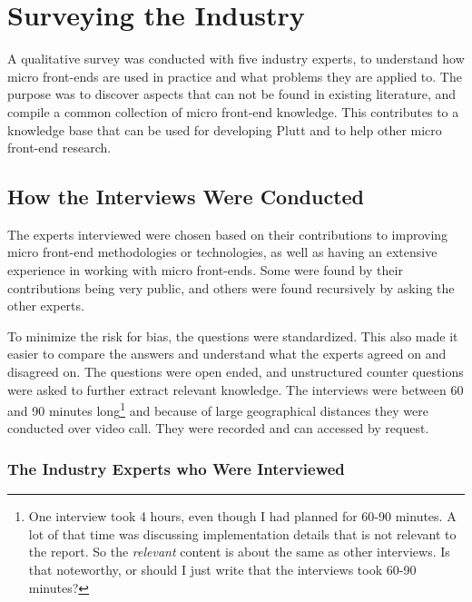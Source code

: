 \chapter{Surveying the Industry}
\label{sec:interviews}

A qualitative survey was conducted with five industry experts, to understand how micro front-ends are used in practice and what problems they are applied to. The purpose was to discover aspects that can not be found in existing literature, and compile a common collection of micro front-end knowledge. This contributes to a knowledge base that can be used for developing Plutt and to help other micro front-end research.

\section{How the Interviews Were Conducted}

The experts interviewed were chosen based on their contributions to improving micro front-end methodologies or technologies, as well as having an extensive experience in working with micro front-ends. Some were found by their contributions being very public, and others were found recursively by asking the other experts.

To minimize the risk for bias, the questions were standardized. This also made it easier to compare the answers and understand what the experts agreed on and disagreed on. The questions were open ended, and unstructured counter questions were asked to further extract relevant knowledge. The interviews were between 60 and 90 minutes long\footnote{One interview took 4 hours, even though I had planned for 60-90 minutes. A lot of that time was discussing implementation details that is not relevant to the report. So the \textit{relevant} content is about the same as other interviews. Is that noteworthy, or should I just write that the interviews took 60-90 minutes?} and because of large geographical distances they were conducted over video call. They were recorded and can accessed by request.

\subsection{The Industry Experts who Were Interviewed}

